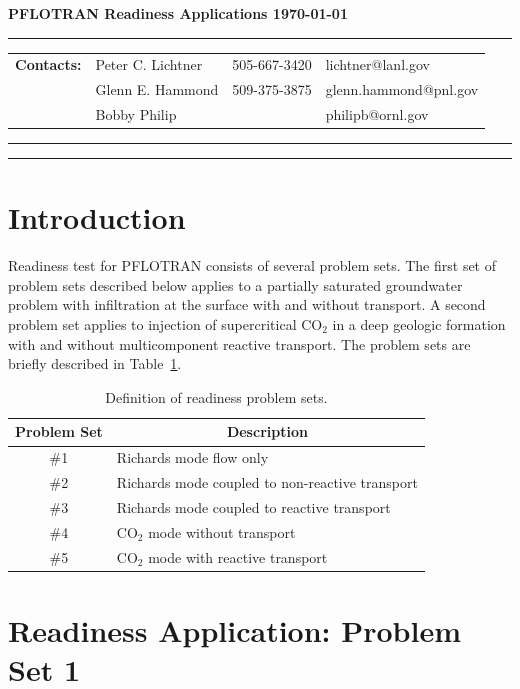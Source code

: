 \documentclass[12pt]{article}
\newcommand{\longline}{\noindent\rule[-0.1in]{\textwidth}{0.01in}}
\begin{document}
{\noindent\bf\Large PFLOTRAN Readiness Applications \hfill \today}

\longline

\noindent
\begin{tabular}{llll}
{\bf Contacts:} &Peter C. Lichtner & 505-667-3420 & lichtner@lanl.gov\\
&Glenn E. Hammond & 509-375-3875 & glenn.hammond@pnl.gov\\
&Bobby Philip & & philipb@ornl.gov
\end{tabular}

\longline

\tableofcontents

\longline

\section{Introduction}

Readiness test for PFLOTRAN consists of several problem sets. 
The first set of problem sets described below applies to a partially saturated groundwater problem with infiltration at the surface with and without transport. A second problem set applies to injection of supercritical CO$_2$ in a deep geologic formation with and without multicomponent reactive transport. The problem sets are briefly described in Table~\ref{tprobset}.

\begin{table}[h]\centering
\caption{Definition of readiness problem sets.}\label{tprobset}
\vspace{3mm}
\begin{tabular}{cl}
\toprule
{\bf Problem Set} & \multicolumn{1}{c}{\bf Description}\\
\midrule
\#1 & Richards mode flow only\\
\#2 & Richards mode coupled to non-reactive transport\\
\#3 & Richards mode coupled to reactive transport\\
\#4 & CO$_2$ mode without transport\\
\#5 & CO$_2$ mode with reactive transport\\
\bottomrule
\end{tabular}
\end{table}

\section{Readiness Application: Problem Set 1}
\end{document}

